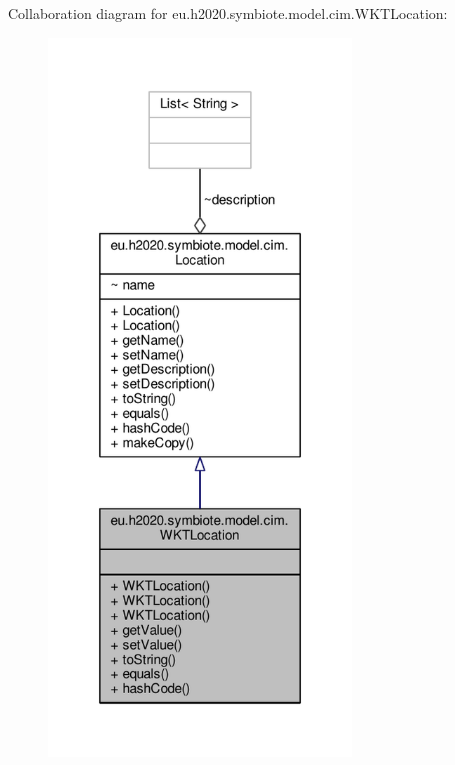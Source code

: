 Collaboration diagram for eu.\+h2020.\+symbiote.\+model.\+cim.\+W\+K\+T\+Location\+:\nopagebreak
\begin{figure}[H]
\begin{center}
\leavevmode
\includegraphics[width=228pt]{classeu_1_1h2020_1_1symbiote_1_1model_1_1cim_1_1WKTLocation__coll__graph}
\end{center}
\end{figure}

